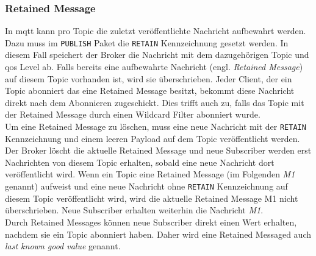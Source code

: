 \subsubsection{Retained Message} \label{s:retained-messages}
In \ac{mqtt} kann pro Topic die zuletzt veröffentlichte Nachricht aufbewahrt werden.
Dazu muss im \verb|PUBLISH| Paket die \verb|RETAIN| Kennzeichnung gesetzt werden.
In diesem Fall speichert der Broker die Nachricht mit dem dazugehörigen Topic und \ac{qos} Level ab.
Falls bereits eine aufbewahrte Nachricht (engl. \textit{Retained Message}) auf diesem Topic vorhanden ist, wird sie überschrieben.
Jeder Client, der ein Topic abonniert das eine Retained Message besitzt, bekommt diese Nachricht direkt nach dem Abonnieren zugeschickt.
Dies trifft auch zu, falls das Topic mit der Retained Message durch einen Wildcard Filter abonniert wurde.
\cite{teamRetainedMessagesMQTT}
\\
Um eine Retained Message zu löschen, muss eine neue Nachricht mit der \verb|RETAIN| Kennzeichnung und einem leeren Payload auf dem Topic veröffentlicht werden. Der Broker löscht die aktuelle Retained Message und neue Subscriber werden erst Nachrichten von diesem Topic erhalten, sobald eine neue Nachricht dort veröffentlicht wird.
Wenn ein Topic eine Retained Message (im Folgenden \textit{M1} genannt) aufweist und eine neue Nachricht ohne \verb|RETAIN| Kennzeichnung auf diesem Topic veröffentlicht wird, wird die aktuelle Retained Message M1 nicht überschrieben. Neue Subscriber erhalten weiterhin die Nachricht \textit{M1}.
\cite{mqtt5Specification}
\\
Durch Retained Messages können neue Subscriber direkt einen Wert erhalten, nachdem sie ein Topic abonniert haben. Daher wird eine Retained Messaged auch \textit{last known good value} genannt.
\cite{teamRetainedMessagesMQTT}

